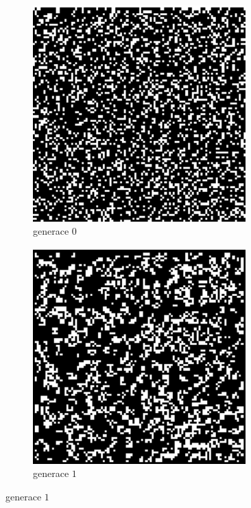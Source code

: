 \begin{figure}
 \begin{subfigure}{0.4\textwidth}
  \includegraphics[width=0.9\textwidth]{genimg-game-of-life-1}
  \caption{generace $0$}
 \end{subfigure}%
 \begin{subfigure}{0.4\textwidth}
  \includegraphics[width=0.9\textwidth]{genimg-game-of-life-2}
  \caption{generace $1$}
 \end{subfigure}
 

\end{figure}
